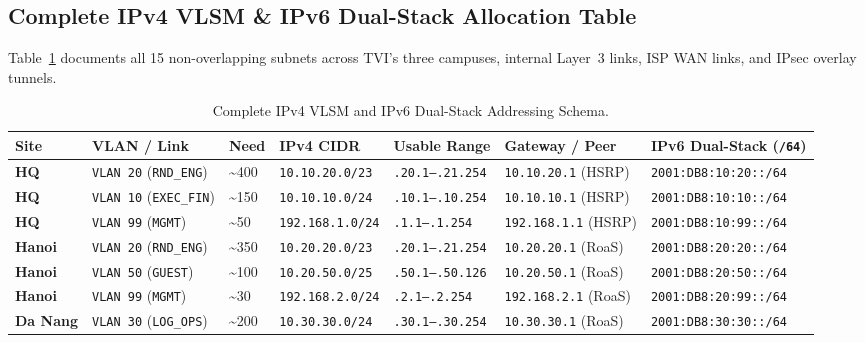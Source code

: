 \subsection{Complete IPv4 VLSM \& IPv6 Dual-Stack Allocation Table}
Table~\ref{tab:ip_allocation} documents all 15 non-overlapping subnets across TVI's three campuses, internal Layer~3 links, ISP WAN links, and IPsec overlay tunnels.

\begin{table}[H]
\centering
\caption{Complete IPv4 VLSM and IPv6 Dual-Stack Addressing Schema.}
\label{tab:ip_allocation}
\scriptsize
\setlength{\tabcolsep}{3.5pt}
\begin{tabularx}{\textwidth}{|p{1.25cm}|p{2.2cm}|p{0.85cm}|p{2.0cm}|p{2.15cm}|p{1.85cm}|X|}
\hline
\textbf{Site} & \textbf{VLAN / Link} & \textbf{Need} & \textbf{IPv4 CIDR} & \textbf{Usable Range} & \textbf{Gateway / Peer} & \textbf{IPv6 Dual-Stack (\texttt{/64})} \\
\hline
\textbf{HQ} & \texttt{VLAN 20} (\texttt{RND\_ENG}) & \textasciitilde 400 & \texttt{10.10.20.0/23} & \texttt{.20.1--.21.254} & \texttt{10.10.20.1} (HSRP) & \texttt{2001:DB8:10:20::/64} \\
\hline
\textbf{HQ} & \texttt{VLAN 10} (\texttt{EXEC\_FIN}) & \textasciitilde 150 & \texttt{10.10.10.0/24} & \texttt{.10.1--.10.254} & \texttt{10.10.10.1} (HSRP) & \texttt{2001:DB8:10:10::/64} \\
\hline
\textbf{HQ} & \texttt{VLAN 99} (\texttt{MGMT}) & \textasciitilde 50 & \texttt{192.168.1.0/24} & \texttt{.1.1--.1.254} & \texttt{192.168.1.1} (HSRP) & \texttt{2001:DB8:10:99::/64} \\
\hline
\textbf{Hanoi} & \texttt{VLAN 20} (\texttt{RND\_ENG}) & \textasciitilde 350 & \texttt{10.20.20.0/23} & \texttt{.20.1--.21.254} & \texttt{10.20.20.1} (RoaS) & \texttt{2001:DB8:20:20::/64} \\
\hline
\textbf{Hanoi} & \texttt{VLAN 50} (\texttt{GUEST}) & \textasciitilde 100 & \texttt{10.20.50.0/25} & \texttt{.50.1--.50.126} & \texttt{10.20.50.1} (RoaS) & \texttt{2001:DB8:20:50::/64} \\
\hline
\textbf{Hanoi} & \texttt{VLAN 99} (\texttt{MGMT}) & \textasciitilde 30 & \texttt{192.168.2.0/24} & \texttt{.2.1--.2.254} & \texttt{192.168.2.1} (RoaS) & \texttt{2001:DB8:20:99::/64} \\
\hline
\textbf{Da Nang} & \texttt{VLAN 30} (\texttt{LOG\_OPS}) & \textasciitilde 200 & \texttt{10.30.30.0/24} & \texttt{.30.1--.30.254} & \texttt{10.30.30.1} (RoaS) & \texttt{2001:DB8:30:30::/64} \\

\end{tabularx}
\end{table}
